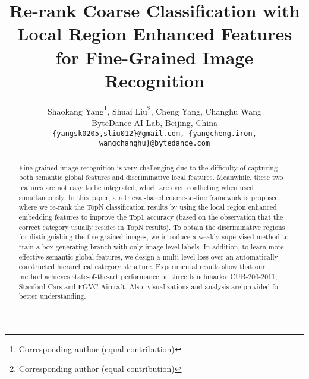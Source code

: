\documentclass[10pt,twocolumn,letterpaper]{article}
\begin{document}
\title{Re-rank Coarse Classification with Local Region Enhanced Features for Fine-Grained Image Recognition}








\author{
	Shaokang Yang\thanks{Corresponding author (equal contribution)},
	\;\; Shuai Liu\thanks{Corresponding author (equal contribution)},
	\;\; Cheng Yang,
	\;\; Changhu Wang\\	
	ByteDance AI Lab, Beijing, China\\	
	{\tt\small \{yangsk0205,sliu012\}@gmail.com, \{yangcheng.iron, wangchanghu\}@bytedance.com}
}





\maketitle




\begin{abstract}
   Fine-grained image recognition is very challenging due to the difficulty of capturing both semantic global features and discriminative local features. Meanwhile, these two features are not easy to be integrated, which are even conflicting when used simultaneously. In this paper, a retrieval-based coarse-to-fine framework is proposed, where we re-rank the TopN classification results by using the local region enhanced embedding features to improve the Top1 accuracy (based on the observation that the correct category usually resides in TopN results). To obtain the discriminative regions for distinguishing the fine-grained images, we introduce a weakly-supervised method to train a box generating branch with only image-level labels. In addition, to learn more effective semantic global features, we design a multi-level loss over an automatically constructed hierarchical category structure. Experimental results show that our method achieves state-of-the-art performance on three benchmarks: CUB-200-2011, Stanford Cars and FGVC Aircraft. Also, visualizations and analysis are provided for better understanding.
\end{abstract}
\end{document}
